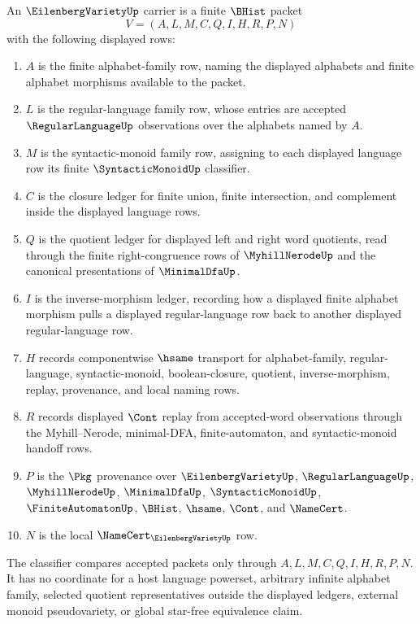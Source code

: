 \begin{definition}
\label{def:eilenberg-variety-carrier}
An $\EilenbergVarietyUp$ carrier is a finite $\BHist$ packet
$$
V=(A,L,M,C,Q,I,H,R,P,N)
$$
with the following displayed rows:
\begin{enumerate}
\item $A$ is the finite alphabet-family row, naming the displayed alphabets and finite alphabet morphisms available to the packet.
\item $L$ is the regular-language family row, whose entries are accepted $\RegularLanguageUp$ observations over the alphabets named by $A$.
\item $M$ is the syntactic-monoid family row, assigning to each displayed language row its finite $\SyntacticMonoidUp$ classifier.
\item $C$ is the closure ledger for finite union, finite intersection, and complement inside the displayed language rows.
\item $Q$ is the quotient ledger for displayed left and right word quotients, read through the finite right-congruence rows of $\MyhillNerodeUp$ and the canonical presentations of $\MinimalDfaUp$.
\item $I$ is the inverse-morphism ledger, recording how a displayed finite alphabet morphism pulls a displayed regular-language row back to another displayed regular-language row.
\item $H$ records componentwise $\hsame$ transport for alphabet-family, regular-language, syntactic-monoid, boolean-closure, quotient, inverse-morphism, replay, provenance, and local naming rows.
\item $R$ records displayed $\Cont$ replay from accepted-word observations through the Myhill--Nerode, minimal-DFA, finite-automaton, and syntactic-monoid handoff rows.
\item $P$ is the $\Pkg$ provenance over $\EilenbergVarietyUp$, $\RegularLanguageUp$, $\MyhillNerodeUp$, $\MinimalDfaUp$, $\SyntacticMonoidUp$, $\FiniteAutomatonUp$, $\BHist$, $\hsame$, $\Cont$, and $\NameCert$.
\item $N$ is the local $\NameCert_{\EilenbergVarietyUp}$ row.
\end{enumerate}
The classifier compares accepted packets only through $A,L,M,C,Q,I,H,R,P,N$. It has no coordinate for a host language powerset, arbitrary infinite alphabet family, selected quotient representatives outside the displayed ledgers, external monoid pseudovariety, or global star-free equivalence claim.
\end{definition}

